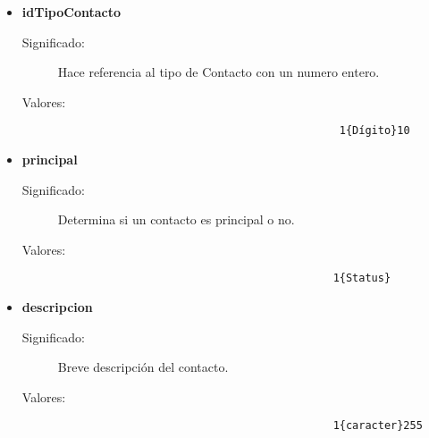 \begin{itemize}
        \item \textbf{idTipoContacto}
		\begin{description}
			\item [Significado:] Hace referencia al tipo de Contacto con un numero entero.
			\item [Valores:]{\begin{lstlisting}
                                            1{Dígito}10
                                         \end{lstlisting}} 
		\end{description}
        \item \textbf{principal}
		\begin{description}
			\item [Significado:] Determina si un contacto es principal o no.
			\item [Valores:]{\begin{lstlisting}
                                           1{Status}
                                         \end{lstlisting}} 
		\end{description}

        \item \textbf{descripcion}
		\begin{description}
			\item [Significado:] Breve descripción del contacto.
			\item [Valores:]{\begin{lstlisting}
                                           1{caracter}255
                                         \end{lstlisting}} 
		\end{description}
\end{itemize}

